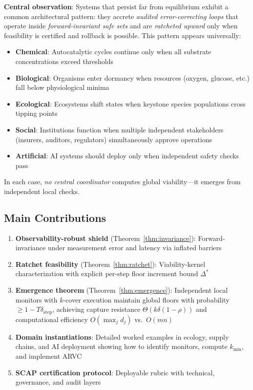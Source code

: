 \documentclass[11pt,a4paper]{article}
\begin{document}
\textbf{Central observation}: Systems that persist far from equilibrium exhibit a common architectural pattern: they accrete \emph{audited error-correcting loops} that operate inside \emph{forward-invariant safe sets} and are \emph{ratcheted upward} only when feasibility is certified and rollback is possible. This pattern appears universally:

\begin{itemize}
\item \textbf{Chemical}: Autocatalytic cycles continue only when all substrate concentrations exceed thresholds
\item \textbf{Biological}: Organisms enter dormancy when resources (oxygen, glucose, etc.) fall below physiological minima
\item \textbf{Ecological}: Ecosystems shift states when keystone species populations cross tipping points
\item \textbf{Social}: Institutions function when multiple independent stakeholders (insurers, auditors, regulators) simultaneously approve operations
\item \textbf{Artificial}: AI systems should deploy only when independent safety checks pass
\end{itemize}

In each case, \emph{no central coordinator} computes global viability—it emerges from independent local checks.

\subsection{Main Contributions}

\begin{enumerate}
\item \textbf{Observability-robust shield} (Theorem~\ref{thm:invariance}): Forward-invariance under measurement error and latency via inflated barriers
\item \textbf{Ratchet feasibility} (Theorem~\ref{thm:ratchet}): Viability-kernel characterization with explicit per-step floor increment bound $\Delta^*$
\item \textbf{Emergence theorem} (Theorem~\ref{thm:emergence}): Independent local monitors with $k$-cover execution maintain global floors with probability $\geq 1-T\delta_{\text{step}}$, achieving capture resistance $\Theta(k \delta (1-\rho))$ and computational efficiency $O(\max_j d_j)$ vs.~$O(mn)$
\item \textbf{Domain instantiations}: Detailed worked examples in ecology, supply chains, and AI deployment showing how to identify monitors, compute $k_{\min}$, and implement ARVC
\item \textbf{SCAP certification protocol}: Deployable rubric with technical, governance, and audit layers
\end{enumerate}
\end{document}
